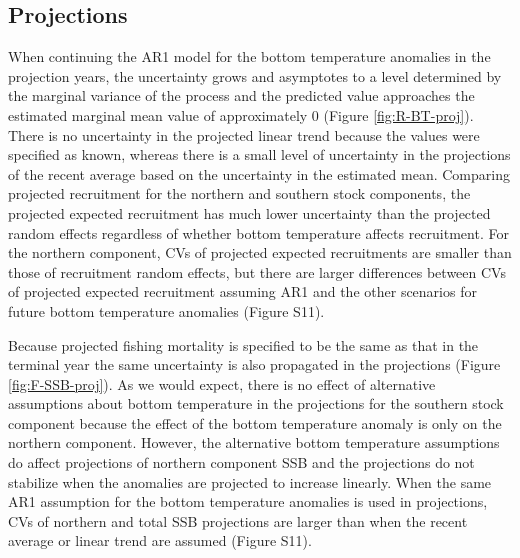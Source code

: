\documentclass[
]{article}
\begin{document}
\hypertarget{projections-1}{%
\subsection*{Projections}\label{projections-1}}

When continuing the AR1 model for the bottom temperature anomalies in the projection years, the uncertainty grows and asymptotes to a level determined by the marginal variance of the process and the predicted value approaches the estimated marginal mean value of approximately 0 (Figure \ref{fig:R-BT-proj}). There is no uncertainty in the projected linear trend because the values were specified as known, whereas there is a small level of uncertainty in the projections of the recent average based on the uncertainty in the estimated mean. Comparing projected recruitment for the northern and southern stock components, the projected expected recruitment has much lower uncertainty than the projected random effects regardless of whether bottom temperature affects recruitment. For the northern component, CVs of projected expected recruitments are smaller than those of recruitment random effects, but there are larger differences between CVs of projected expected recruitment assuming AR1 and the other scenarios for future bottom temperature anomalies (Figure S11).

Because projected fishing mortality is specified to be the same as that in the terminal year the same uncertainty is also propagated in the projections (Figure \ref{fig:F-SSB-proj}). As we would expect, there is no effect of alternative assumptions about bottom temperature in the projections for the southern stock component because the effect of the bottom temperature anomaly is only on the northern component. However, the alternative bottom temperature assumptions do affect projections of northern component SSB and the projections do not stabilize when the anomalies are projected to increase linearly. When the same AR1 assumption for the bottom temperature anomalies is used in projections, CVs of northern and total SSB projections are larger than when the recent average or linear trend are assumed (Figure S11).
\end{document}
